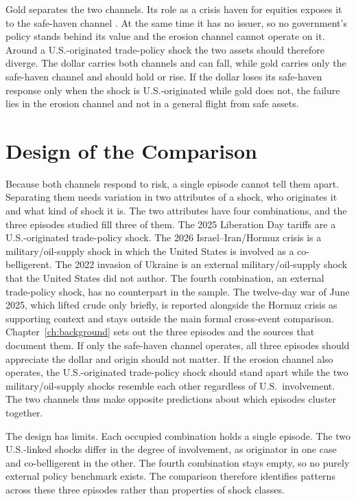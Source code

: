Gold separates the two channels. Its role as a crisis haven for equities exposes it to the safe-haven channel \parencite{baur_lucey_2010}. At the same time it has no issuer, so no government's policy stands behind its value and the erosion channel cannot operate on it. Around a U.S.-originated trade-policy shock the two assets should therefore diverge. The dollar carries both channels and can fall, while gold carries only the safe-haven channel and should hold or rise. If the dollar loses its safe-haven response only when the shock is U.S.-originated while gold does not, the failure lies in the erosion channel and not in a general flight from safe assets.

\section{Design of the Comparison}
\label{sec:fw_classification}

Because both channels respond to risk, a single episode cannot tell them apart. Separating them needs variation in two attributes of a shock, who originates it and what kind of shock it is. The two attributes have four combinations, and the three episodes studied fill three of them. The 2025 Liberation Day tariffs are a U.S.-originated trade-policy shock. The 2026 Israel--Iran/Hormuz crisis is a military/oil-supply shock in which the United States is involved as a co-belligerent. The 2022 invasion of Ukraine is an external military/oil-supply shock that the United States did not author. The fourth combination, an external trade-policy shock, has no counterpart in the sample. The twelve-day war of June 2025, which lifted crude only briefly, is reported alongside the Hormuz crisis as supporting context and stays outside the main formal cross-event comparison. Chapter~\ref{ch:background} sets out the three episodes and the sources that document them. If only the safe-haven channel operates, all three episodes should appreciate the dollar and origin should not matter. If the erosion channel also operates, the U.S.-originated trade-policy shock should stand apart while the two military/oil-supply shocks resemble each other regardless of U.S.\ involvement. The two channels thus make opposite predictions about which episodes cluster together.

The design has limits. Each occupied combination holds a single episode. The two U.S.-linked shocks differ in the degree of involvement, as originator in one case and co-belligerent in the other. The fourth combination stays empty, so no purely external policy benchmark exists. The comparison therefore identifies patterns across these three episodes rather than properties of shock classes.

